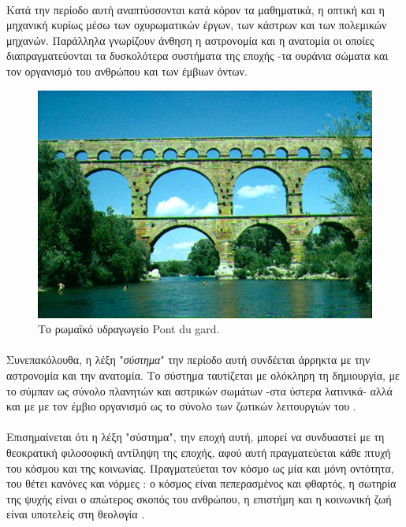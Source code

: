\documentclass[a4paper,12pt,twoside]{report}
\begin{document}
			\paragraph{}{Κατά την περίοδο αυτή αναπτύσσονται κατά κόρον τα μαθηματικά, η  οπτική και η μηχανική κυρίως μέσω των οχυρωματικών έργων, των κάστρων και των πολεμικών μηχανών. Παράλληλα γνωρίζουν άνθηση η αστρονομία και η ανατομία οι οποίες διαπραγματεύονται τα δυσκολότερα συστήματα της εποχής -τα ουράνια σώματα και τον οργανισμό του ανθρώπου και των έμβιων όντων.
			}
			\begin{figure}[h]
				\centering
				\includegraphics[scale=0.30]{pont_du_gard.jpg}
				\caption{Το ρωμαϊκό υδραγωγείο Pont du gard.\cite{PontDuGard}}
				\label{φωτ:Ο ρωμαϊκό υδραγωγείο Pont du gard}
			\end{figure}
			
			\paragraph{}{Συνεπακόλουθα, η λέξη "\textit{σύστημα}" την περίοδο αυτή συνδέεται άρρηκτα με την αστρονομία και την ανατομία. Το σύστημα ταυτίζεται με ολόκληρη τη δημιουργία, με το σύμπαν ως σύνολο πλανητών και αστρικών σωμάτων -στα ύστερα λατινικά- αλλά και με με τον έμβιο οργανισμό ως το σύνολο των ζωτικών λειτουργιών του \cite{Dictionary.com}.
			}
			\paragraph{}{Επισημαίνεται ότι η λέξη "σύστημα", την εποχή αυτή, μπορεί να συνδυαστεί με τη θεοκρατική φιλοσοφική αντίληψη της εποχής, αφού αυτή πραγματεύεται κάθε πτυχή του κόσμου και της κοινωνίας. Πραγματεύεται τον κόσμο ως μία και μόνη οντότητα, του θέτει κανόνες και νόρμες : ο κόσμος είναι πεπερασμένος και φθαρτός, η σωτηρία της ψυχής είναι ο απώτερος σκοπός του ανθρώπου, η επιστήμη και η κοινωνική ζωή είναι υποτελείς στη θεολογία \cite{GeneralSystemsTheory:Skyttner2005}.
			}
		
\end{document}
